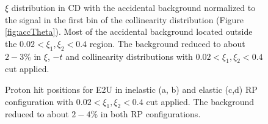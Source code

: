 \begin{enumerate}
\begin{figure}[H]
{\begin{subfigure}[b]{\linewidth}{
				}
		\end{subfigure}
	}
	\caption[x]{$\xi$ distribution in CD with the accidental background normalized to the signal in the first bin of the collinearity distribution (Figure \ref{fig:accTheta}). Most of the accidental background located outside the $0.02<\xi_1,\xi_2<0.4$ region. The background reduced to about $2-3\%$ in $\xi$, $-t$ and collinearity distributions with $0.02<\xi_1,\xi_2<0.4$ cut applied.}
	\label{fig:xecCutAcc}
\end{figure}
\end{enumerate}
\begin{figure}[H]
	\centering
	\parbox{0.48\textwidth}{
		\centering
		\begin{subfigure}[b]{\linewidth}{
				}
		\end{subfigure}
	}
	\quad
	\parbox{0.48\textwidth}{
		\centering
		\begin{subfigure}[b]{\linewidth}{
				}
		\end{subfigure}
	}
	\parbox{0.48\textwidth}{
		\centering
		\begin{subfigure}[b]{\linewidth}{
				}
		\end{subfigure}
	}
	\quad
	\parbox{0.48\textwidth}{
		\centering
		\begin{subfigure}[b]{\linewidth}{
				}
		\end{subfigure}
	}
	\caption[x]{Proton hit positions for E2U in inelastic (a, b) and elastic (c,d) RP configuration with $0.02<\xi_1,\xi_2<0.4$ cut applied. The background reduced to about $2-4\%$ in both RP configurations.}
\end{figure}
